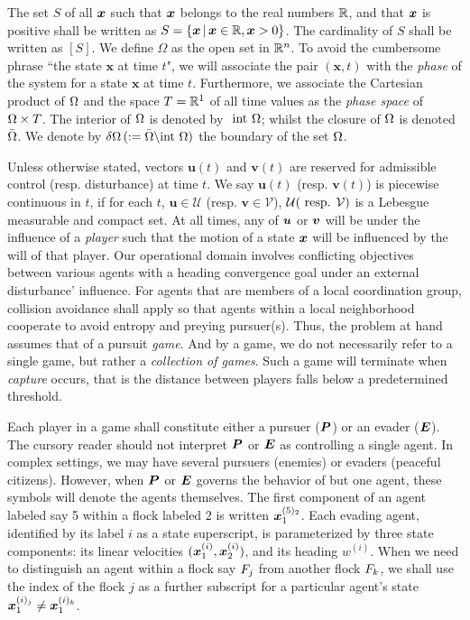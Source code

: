  The set $S$ of all $\bm{x}$ such that $\bm{x}$ belongs to the real numbers  $\mathbb{R}$, and that $\bm{x}$ is positive shall be written as $S=\{\bm{x}\,|\, \bm{x} \in \mathbb{R}, \bm{x} >0\}$. The cardinality of $S$ shall be written as $\left[S\right]$. We define $\Omega$ as the open set in $\mathbb{R}^n$.  To avoid the cumbersome phrase ``the state $\bm{x}$ at time $t$", we will associate the pair $(\bm{x}, t)$ with the \textit{phase} of the system for a state $\bm{x}$ at time $t$. Furthermore, we associate the Cartesian product of $\Omega$ and the space $T =\mathbb{R}^1$ of all time values as the \textit{phase space} of $\Omega \times T$. The interior of $\Omega$ is denoted by $\text{ int } \Omega$; whilst the closure of $\Omega$ is denoted $\bar{\Omega}$. We denote by $\delta \Omega \,(:= \bar{\Omega} \backslash \text{int } \Omega)$ the boundary of the set $\Omega$. 

Unless otherwise stated, vectors $\bm{u}(t)$ and $\bm{v}(t)$ are reserved for admissible control (resp. disturbance) at time $t$. We say $\bm{u}(t)$ (resp. $\bm{v}(t)$) is piecewise continuous in $t$, if for each $t$, $\bm{u} \in \mathcal{U}$ (resp. $\bm{v} \in \mathcal{V}$), $\mathcal{U}(\text{ resp. } \mathcal{V})$ is a Lebesgue measurable and compact set. At all times, any of $\bm{u}$ or $\bm{v}$ will be under the influence of a \textit{player} such that the motion of a state $\bm{x}$ will be influenced by the will of that player. Our operational domain involves conflicting objectives between various agents \eg with a heading convergence goal under an external disturbance' influence. For agents that are members of a local coordination group, collision avoidance shall apply so that  agents within a local neighborhood cooperate to avoid entropy and preying pursuer(s). Thus, the problem at hand assumes that of a pursuit \textit{game}.  And by a game, we do not necessarily refer to a single game, but rather a \textit{collection of games}. Such a game will terminate when \textit{capture} occurs, that is the distance between players falls below a predetermined threshold. 

Each player in a game shall constitute either a pursuer ($\bm{P}$) or an evader ($\bm{E}$). The cursory reader should not interpret $\bm{P}$ or $\bm{E}$ as controlling a single agent. In complex settings, we may have several pursuers (enemies) or evaders (peaceful citizens). However, when $\bm{P}$ or $\bm{E}$ governs the behavior of but one agent, these symbols will denote the agents themselves. %
The first  component of an agent labeled say 5 within a flock labeled $2$ is written $\bm{x}^{(5)_2}_1$. 
Each evading agent, identified by its  label $i$ as a state superscript,  is parameterized by three state components: its linear velocities $(\bm{x}_1^{(i)}, \bm{x}_2^{(i)})$, and its heading $w^{(i)}$. When we need to distinguish an agent within a flock say $F_j$ from another flock $F_k$, we shall use the index of the flock \eg $j$ as a further subscript for a particular agent's state \ie  $\bm{x}_1^{(i)_j} \neq \bm{x}_1^{(i)_k}$.

